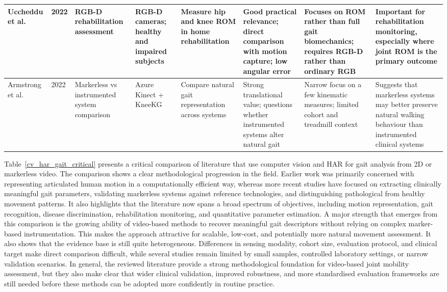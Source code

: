 \documentclass[12pt]{elsarticle}
\begin{document}
{\begin{longtable}{p{1.8cm} p{0.8cm} p{1.4cm} p{1.8cm} p{2.0cm} p{2.2cm} p{2.2cm} p{3.3cm}}
Uccheddu et al. \cite{uccheddu2022rgb}
& 2022
& RGB-D rehabilitation assessment
& RGB-D cameras; healthy and impaired subjects
& Measure hip and knee ROM in home rehabilitation
& Good practical relevance; direct comparison with motion capture; low angular error
& Focuses on ROM rather than full gait biomechanics; requires RGB-D rather than ordinary RGB
& Important for rehabilitation monitoring, especially where joint ROM is the primary outcome \\
\hline

Armstrong et al. \cite{armstrong2022novel}
& 2022
& Markerless vs instrumented system comparison
& Azure Kinect + KneeKG
& Compare natural gait representation across systems
& Strong translational value; questions whether instrumented systems alter natural gait
& Narrow focus on a few kinematic measures; limited cohort and treadmill context
& Suggests that markerless systems may better preserve natural walking behaviour than instrumented clinical systems \\
\hline
\end{longtable}
}

Table~\ref{cv_har_gait_critical} presents a critical comparison of literature that use computer vision and HAR for gait analysis from 2D or markerless video. The comparison shows a clear methodological progression in the field. Earlier work was primarily concerned with representing articulated human motion in a computationally efficient way, whereas more recent studies have focused on extracting clinically meaningful gait parameters, validating markerless systems against reference technologies, and distinguishing pathological from healthy movement patterns. It also highlights that the literature now spans a broad spectrum of objectives, including motion representation, gait recognition, disease discrimination, rehabilitation monitoring, and quantitative parameter estimation. A major strength that emerges from this comparison is the growing ability of video-based methods to recover meaningful gait descriptors without relying on complex marker-based instrumentation. This makes the approach attractive for scalable, low-cost, and potentially more natural movement assessment. It also shows that the evidence base is still quite heterogeneous. Differences in sensing modality, cohort size, evaluation protocol, and clinical target make direct comparison difficult, while several studies remain limited by small samples, controlled laboratory settings, or narrow validation scenarios. In general, the reviewed literature provide a strong methodological foundation for video-based joint mobility assessment, but they also make clear that wider clinical validation, improved robustness, and more standardised evaluation frameworks are still needed before these methods can be adopted more confidently in routine practice.
\end{document}
